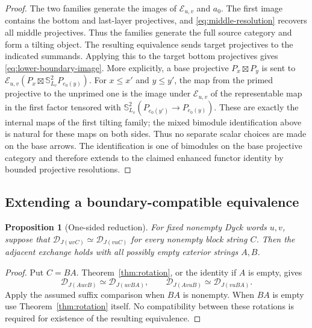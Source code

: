 \documentclass[11pt]{article}
\newtheorem{proposition}[theorem]{Proposition}
\theoremstyle{definition}
\begin{document}
\begin{proof}
The two families generate the images of $\mathcal E_{u,v}$ and
$a_0$. The first image contains the bottom and last-layer
projectives, and \eqref{eq:middle-resolution} recovers all middle
projectives. Thus the families generate the full source category
and form a tilting object. The resulting equivalence sends target
projectives to the indicated summands. Applying this to the target
bottom projectives gives \eqref{eq:lower-boundary-image}.
More explicitly, a base projective $P_x\boxtimes P_y$ is sent to
$\mathcal E_{u,v}(P_x\boxtimes\mathbb S_{L_v}^2P_{e_0(y)})$.
For $x\leq x'$ and $y\leq y'$, the map from the primed projective
to the unprimed one is the image under $\mathcal E_{u,v}$ of the
representable map in the first factor tensored with
$\mathbb S_{L_v}^2(P_{e_0(y')}\to P_{e_0(y)})$.
These are exactly the internal maps of the first tilting family;
the mixed bimodule identification above is natural for these maps
on both sides. Thus no separate scalar choices are made on the
base arrows. The identification is one of bimodules on the base
projective category and therefore extends to the claimed enhanced
functor identity by bounded projective resolutions.
\end{proof}


\subsection{Extending a boundary-compatible equivalence}
\begin{proposition}[One-sided reduction]\label{prop:one-sided}
For fixed nonempty Dyck words $u,v$, suppose that
$\mathcal D_{J(uvC)}\simeq\mathcal D_{J(vuC)}$ for every nonempty
block string $C$. Then the adjacent exchange holds with all
possibly empty exterior strings $A,B$.
\end{proposition}
\begin{proof}
Put $C=BA$. Theorem~\ref{thm:rotation}, or the identity if $A$ is
empty, gives
\[
 \mathcal D_{J(AuvB)}\simeq\mathcal D_{J(uvBA)},\qquad
 \mathcal D_{J(AvuB)}\simeq\mathcal D_{J(vuBA)}.
\]
Apply the assumed suffix comparison when $BA$ is nonempty.
When $BA$ is empty use Theorem~\ref{thm:rotation} itself. No
compatibility between these rotations is required for existence
of the resulting equivalence.
\end{proof}
\end{document}
